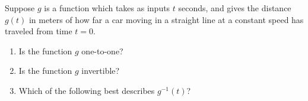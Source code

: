 \documentclass{ximera}
\author{Alexander Goldman}
\begin{document}
Suppose $g$ is a function which takes as inputs $t$ seconds, and gives the distance $g(t)$ in meters of how far a car moving in a straight line at a constant speed has traveled from time $t=0$. 

\begin{exercise}

\begin{enumerate}
\item Is the function $g$ one-to-one?
\begin{multipleChoice}
\end{multipleChoice}

\item Is the function $g$ invertible?
\begin{multipleChoice}
\end{multipleChoice}

\item Which of the following best describes $g^{-1}(t)$?
\begin{multipleChoice}
\end{multipleChoice}
\end{enumerate}

\end{exercise}
\end{document}

